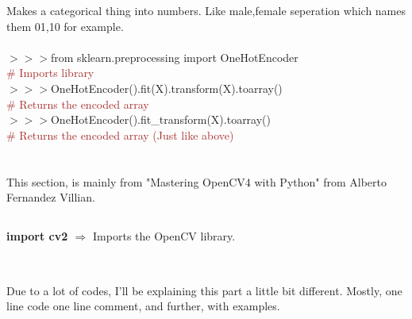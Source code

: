 \documentclass[a4paper,18pt]{article}
\begin{document}
Makes a categorical thing into numbers. Like male,female seperation which names them 01,10 for example.\\\\

$>>>$from sklearn.preprocessing import OneHotEncoder\\{\textcolor{brown}{\# Imports library}}\\

$>>>$OneHotEncoder().fit(X).transform(X).toarray()\\{\textcolor{brown}{\# Returns the encoded array}}\\

$>>>$OneHotEncoder().fit\_transform(X).toarray()\\{\textcolor{brown}{\# Returns the encoded array (Just like above)}}\\


\newpage

\section{\colorbox {Abi}{}}
This section, is mainly from "Mastering OpenCV4 with Python" from Alberto Fernandez Villian.
\subsection{\colorbox {matgreen}{\color{white}{\large import cv2}}}
\textbf{import cv2 $\Rightarrow$} Imports the OpenCV library.\\\\


\subsection{\colorbox {matgreen}{\color{white}{\large Primary Works on Image}}}
Due to a lot of codes, I'll be explaining this part a little bit different. Mostly, one line code one line comment, and further, with examples.\\\\
\end{document}
